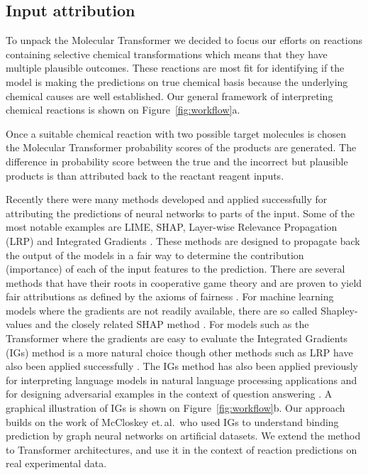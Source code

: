 \subsection{Input attribution} \label{subsec:input_attribution}
To unpack the Molecular Transformer we decided to focus our efforts on reactions containing selective chemical transformations which means that they have multiple plausible outcomes. These reactions are most fit for identifying if the model is making the predictions on true chemical basis because the underlying chemical causes are well established. Our general framework of interpreting chemical reactions is shown on Figure~\ref{fig:workflow}a.

Once a suitable chemical reaction with two possible target molecules is chosen the Molecular Transformer probability scores of the products are generated. The difference in probability score between the true and the incorrect but plausible products is than attributed back to the reactant reagent inputs.

Recently there were many methods developed and applied successfully for attributing the predictions of neural networks to parts of the input. Some of the most notable examples are LIME, SHAP, Layer-wise Relevance Propagation (LRP) and Integrated Gradients \cite{Ribeiro2016WhyClassifier, Lundberg2017APredictions, Montavon2018MethodsNetworks, Sundararajan2017}. These methods are designed to propagate back the output of the models in a fair way to determine the contribution (importance) of each of the input features to the prediction. There are several methods that have their roots in cooperative game theory and are proven to yield fair attributions as defined by the axioms of fairness \cite{Sundararajan2017}. For machine learning models where the gradients are not readily available, there are so called Shapley-values and the closely related SHAP method \cite{Lundberg2017APredictions}. For models such as the Transformer where the gradients are easy to evaluate the Integrated Gradients (IGs) method is a more natural choice \cite{Sundararajan2017} though other methods such as LRP have also been applied successfully \cite{Karpov2020}. The IGs method has also been applied previously for interpreting language models in natural language processing applications and for designing adversarial examples in the context of question answering \cite{mudrakarta2018did}. A graphical illustration of IGs is shown on Figure~\ref{fig:workflow}b. Our approach builds on the work of McCloskey et.\,al.\,\cite{McCloskey2019} who used IGs to understand binding prediction by graph neural networks on artificial datasets. We extend the method to Transformer architectures, and use it in the context of reaction predictions on real experimental data.

